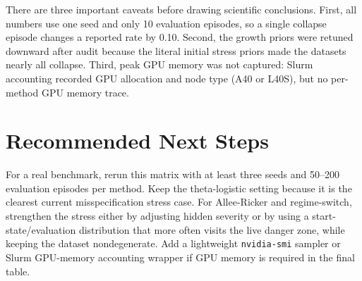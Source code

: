 \documentclass[11pt]{article}
\begin{document}
There are three important caveats before drawing scientific conclusions.
First, all numbers use one seed and only 10 evaluation episodes, so a single
collapse episode changes a reported rate by 0.10. Second, the growth priors
were retuned downward after audit because the literal initial stress priors
made the datasets nearly all collapse. Third, peak GPU memory was not captured:
Slurm accounting recorded GPU allocation and node type (A40 or L40S), but no
per-method GPU memory trace.

\section{Recommended Next Steps}

For a real benchmark, rerun this matrix with at least three seeds and 50--200
evaluation episodes per method. Keep the theta-logistic setting because it is
the clearest current misspecification stress case. For Allee-Ricker and
regime-switch, strengthen the stress either by adjusting hidden severity or by
using a start-state/evaluation distribution that more often visits the live
danger zone, while keeping the dataset nondegenerate. Add a lightweight
\texttt{nvidia-smi} sampler or Slurm GPU-memory accounting wrapper if GPU
memory is required in the final table.
\end{document}
